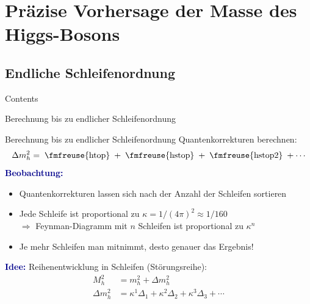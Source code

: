 \documentclass[hyperref={pdfpagelabels=false},ngerman]{beamer}
\newcommand{\fmfvcenter}[1]{\;\vcenter{\hbox{\fmfreuse{#1}}}\;}
\newcommand{\MS}{\ensuremath{M_S}}
\renewcommand{\emph}[1]{\textbf{\textcolor{darkblue}{#1}}}
\newcommand{\MSSM}{\ensuremath{\text{MSSM}}}
\begin{document}

\section{Präzise Vorhersage der Masse des Higgs-Bosons}

\subsection{Endliche Schleifenordnung}

\begin{frame}{Contents}
\end{frame}

\begin{frame}{Berechnung bis zu endlicher Schleifenordnung}
  \begin{center}
  \end{center}
\end{frame}

\begin{frame}{Berechnung bis zu endlicher Schleifenordnung}
  Quantenkorrekturen berechnen:
  \begin{align*}
    \Delta m_h^2 = \fmfvcenter{htop} + \fmfvcenter{hstop} + \fmfvcenter{hstop2} + \cdots
  \end{align*}
  \emph{Beobachtung:}
  \begin{itemize}
  \item Quantenkorrekturen lassen sich nach der Anzahl der Schleifen
    sortieren
  \item Jede Schleife ist proportional zu $\kappa = 1/(4\pi)^2 \approx 1/160$\\
    $\Rightarrow$ Feynman-Diagramm mit $n$ Schleifen ist proportional zu $\kappa^n$
  \item Je mehr Schleifen man mitnimmt, desto genauer das Ergebnis!
  \end{itemize}
  \vspace*{1em}
  \emph{Idee:}
  Reihenentwicklung in Schleifen (Störungsreihe):
  \begin{align*}
    M_h^2 &= m_h^2 + \Delta m_h^2 \\
    \Delta m_h^2 &= \kappa^1 \Delta_1 + \kappa^2 \Delta_2 + \kappa^3 \Delta_3 + \cdots
  \end{align*}
\end{frame}
\end{document}
